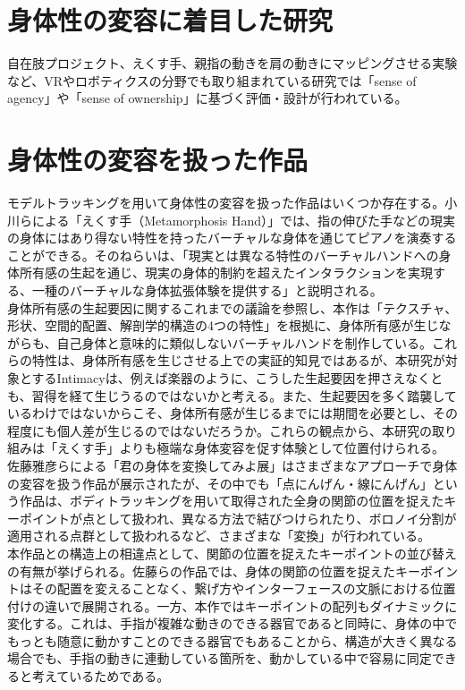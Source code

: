 \section{身体性の変容に着目した研究}
自在肢プロジェクト、えくす手、親指の動きを肩の動きにマッピングさせる実験など、VRやロボティクスの分野でも取り組まれている研究では「sense of agency」や「sense of ownership」に基づく評価・設計が行われている。



\section{身体性の変容を扱った作品}
モデルトラッキングを用いて身体性の変容を扱った作品はいくつか存在する。小川らによる「えくす手（Metamorphosis Hand）」\cite{ekusute}では、指の伸びた手などの現実の身体にはあり得ない特性を持ったバーチャルな身体を通じてピアノを演奏することができる。そのねらいは、「現実とは異なる特性のバーチャルハンドへの身体所有感の生起を通じ、現実の身体的制約を超えたインタラクションを実現する、一種のバーチャルな身体拡張体験を提供する」と説明される。\\
身体所有感の生起要因に関するこれまでの議論を参照し、本作は「テクスチャ、形状、空間的配置、解剖学的構造の4つの特性」を根拠に、身体所有感が生じながらも、自己身体と意味的に類似しないバーチャルハンドを制作している。これらの特性は、身体所有感を生じさせる上での実証的知見ではあるが、本研究が対象とするIntimacyは、例えば楽器のように、こうした生起要因を押さえなくとも、習得を経て生じうるのではないかと考える。また、生起要因を多く踏襲しているわけではないからこそ、身体所有感が生じるまでには期間を必要とし、その程度にも個人差が生じるのではないだろうか。これらの観点から、本研究の取り組みは「えくす手」よりも極端な身体変容を促す体験として位置付けられる。\\
佐藤雅彦らによる「君の身体を変換してみよ展」はさまざまなアプローチで身体の変容を扱う作品が展示されたが、その中でも「点にんげん・線にんげん」という作品は、ボディトラッキングを用いて取得された全身の関節の位置を捉えたキーポイントが点として扱われ、異なる方法で結びつけられたり、ボロノイ分割が適用される点群として扱われるなど、さまざまな「変換」が行われている。\\
本作品との構造上の相違点として、関節の位置を捉えたキーポイントの並び替えの有無が挙げられる。佐藤らの作品では、身体の関節の位置を捉えたキーポイントはその配置を変えることなく、繋げ方やインターフェースの文脈における位置付けの違いで展開される。一方、本作ではキーポイントの配列もダイナミックに変化する。これは、手指が複雑な動きのできる器官であると同時に、身体の中でもっとも随意に動かすことのできる器官でもあることから、構造が大きく異なる場合でも、手指の動きに連動している箇所を、動かしている中で容易に同定できると考えているためである。


